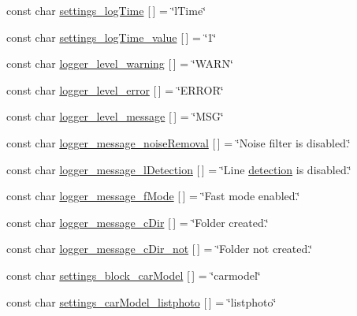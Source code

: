 \begin{DoxyCompactItemize}
\item 
const char \mbox{\hyperlink{namespaceyenot_af1e97f87e798dc626f1a437f23b42199}{settings\+\_\+log\+Time}} \mbox{[}$\,$\mbox{]} = \char`\"{}l\+Time\char`\"{}
\item 
const char \mbox{\hyperlink{namespaceyenot_aa1103de8317b20c60b2ae5da7e05f2b3}{settings\+\_\+log\+Time\+\_\+value}} \mbox{[}$\,$\mbox{]} = \char`\"{}1\char`\"{}
\item 
const char \mbox{\hyperlink{namespaceyenot_ab09d0dabe8840893fe9dc4a855ffc2fa}{logger\+\_\+level\+\_\+warning}} \mbox{[}$\,$\mbox{]} = \char`\"{}W\+A\+RN\char`\"{}
\item 
const char \mbox{\hyperlink{namespaceyenot_a9624d76c2385fbb9861e403225b1d698}{logger\+\_\+level\+\_\+error}} \mbox{[}$\,$\mbox{]} = \char`\"{}E\+R\+R\+OR\char`\"{}
\item 
const char \mbox{\hyperlink{namespaceyenot_a536380830aa21975126348216a729b08}{logger\+\_\+level\+\_\+message}} \mbox{[}$\,$\mbox{]} = \char`\"{}M\+SG\char`\"{}
\item 
const char \mbox{\hyperlink{namespaceyenot_a27e7d588bfc41ad2d47d044d4541dad5}{logger\+\_\+message\+\_\+noise\+Removal}} \mbox{[}$\,$\mbox{]} = \char`\"{}Noise filter is disabled.\char`\"{}
\item 
const char \mbox{\hyperlink{namespaceyenot_a7ba035b0bd5ec0ca88a1741671cf6818}{logger\+\_\+message\+\_\+l\+Detection}} \mbox{[}$\,$\mbox{]} = \char`\"{}Line \mbox{\hyperlink{_core_8h_a0ef39a5ada0921b3abf8906957746b86}{detection}} is disabled.\char`\"{}
\item 
const char \mbox{\hyperlink{namespaceyenot_a5cb3756995a6e5a93819405ca99eb35a}{logger\+\_\+message\+\_\+f\+Mode}} \mbox{[}$\,$\mbox{]} = \char`\"{}Fast mode enabled.\char`\"{}
\item 
const char \mbox{\hyperlink{namespaceyenot_a674d34d95501a1071db0ac7b39c64f57}{logger\+\_\+message\+\_\+c\+Dir}} \mbox{[}$\,$\mbox{]} = \char`\"{}Folder created.\char`\"{}
\item 
const char \mbox{\hyperlink{namespaceyenot_a16669256cbc1918ac8500a364e0ba21d}{logger\+\_\+message\+\_\+c\+Dir\+\_\+not}} \mbox{[}$\,$\mbox{]} = \char`\"{}Folder not created.\char`\"{}
\item 
const char \mbox{\hyperlink{namespaceyenot_ab685b9f0b8baadc950b69329d1fae577}{settings\+\_\+block\+\_\+car\+Model}} \mbox{[}$\,$\mbox{]} = \char`\"{}carmodel\char`\"{}
\item 
const char \mbox{\hyperlink{namespaceyenot_a0a2414e62514c20e76cf0c522ebf38a3}{settings\+\_\+car\+Model\+\_\+listphoto}} \mbox{[}$\,$\mbox{]} = \char`\"{}listphoto\char`\"{}

\end{DoxyCompactItemize}
